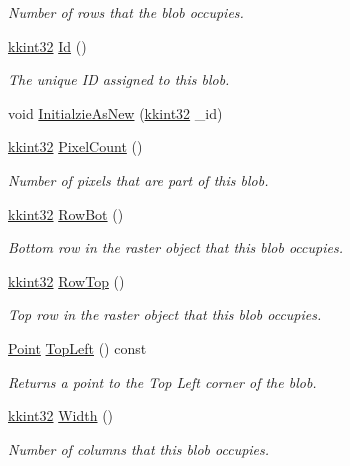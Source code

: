 \begin{DoxyCompactItemize}
\begin{DoxyCompactList}\small\item\em Number of rows that the blob occupies. \end{DoxyCompactList}\item 
\hyperlink{namespace_k_k_b_a8fa4952cc84fda1de4bec1fbdd8d5b1b}{kkint32} \hyperlink{class_k_k_b_1_1_blob_add1ed75f6509956508b71aabeeae213c}{Id} ()
\begin{DoxyCompactList}\small\item\em The unique ID assigned to this blob. \end{DoxyCompactList}\item 
void \hyperlink{class_k_k_b_1_1_blob_a8d0703b3aacfdc6664f81968468962fb}{Initialzie\+As\+New} (\hyperlink{namespace_k_k_b_a8fa4952cc84fda1de4bec1fbdd8d5b1b}{kkint32} \+\_\+id)
\item 
\hyperlink{namespace_k_k_b_a8fa4952cc84fda1de4bec1fbdd8d5b1b}{kkint32} \hyperlink{class_k_k_b_1_1_blob_a5b3f9098a889a0def5eb49287284b847}{Pixel\+Count} ()
\begin{DoxyCompactList}\small\item\em Number of pixels that are part of this blob. \end{DoxyCompactList}\item 
\hyperlink{namespace_k_k_b_a8fa4952cc84fda1de4bec1fbdd8d5b1b}{kkint32} \hyperlink{class_k_k_b_1_1_blob_a6ffc22c0be20c597d49b0f5aa7aad008}{Row\+Bot} ()
\begin{DoxyCompactList}\small\item\em Bottom row in the raster object that this blob occupies. \end{DoxyCompactList}\item 
\hyperlink{namespace_k_k_b_a8fa4952cc84fda1de4bec1fbdd8d5b1b}{kkint32} \hyperlink{class_k_k_b_1_1_blob_ab6735f537773b0a21f2e37c8793f8868}{Row\+Top} ()
\begin{DoxyCompactList}\small\item\em Top row in the raster object that this blob occupies. \end{DoxyCompactList}\item 
\hyperlink{class_k_k_b_1_1_point}{Point} \hyperlink{class_k_k_b_1_1_blob_a563b8d40354febda7059f6ea15796b49}{Top\+Left} () const 
\begin{DoxyCompactList}\small\item\em Returns a point to the Top Left corner of the blob. \end{DoxyCompactList}\item 
\hyperlink{namespace_k_k_b_a8fa4952cc84fda1de4bec1fbdd8d5b1b}{kkint32} \hyperlink{class_k_k_b_1_1_blob_a5cc53690365e2b055c52f159de2efd1b}{Width} ()
\begin{DoxyCompactList}\small\item\em Number of columns that this blob occupies. \end{DoxyCompactList}\end{DoxyCompactItemize}
